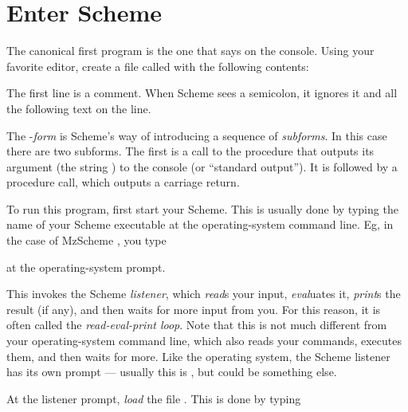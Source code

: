 \chapter{Enter Scheme}
\label{hello}

The canonical first program is the one that says
 on the console.  Using your 
favorite editor, create a file called
 with the following contents:


\n 
{}
The first line is a comment.  When Scheme sees a
semicolon, it ignores it and all the following text on
the line.


The -{\em form} is Scheme's way of
introducing a sequence of {\em subforms}.  In this
case there are two subforms.  The first is a call to
the 
 procedure that outputs its argument
(the string ) to the console (or
``standard output'').  It is followed by a 
procedure call, which outputs a carriage return.


To run this program, first start your Scheme.  This is
usually done by  typing the name of your Scheme
executable at the operating-system command line.
Eg, in the case of MzScheme \cite{mzscheme},
you type


\n at the operating-system prompt.


This invokes the Scheme {\em listener}, which {\em read}s
your input, {\em eval}uates it, {\em print}s the result (if
any), and then waits for more input from you.  For this
reason, it is often called the {\em read-eval-print loop}.
Note that this is not much different from your
operating-system command line, which also reads your
commands, executes them, and then waits for more.  Like the
operating system, the Scheme listener has its own prompt ---
usually this is
\p{>}, but could be something else.


At the listener prompt, {\em load} the file
.  This is done by typing


